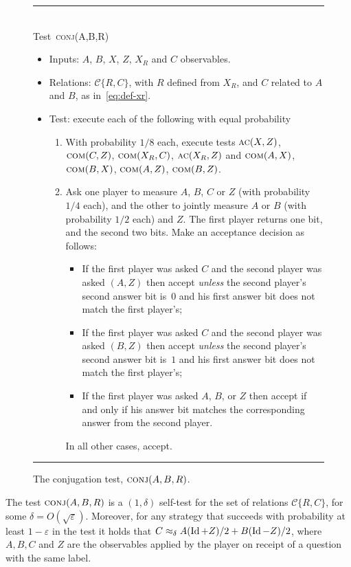 \documentclass{toc}
\newcommand{\Id}{\ensuremath{\mathop{\rm Id}\nolimits}}
\newcommand{\eps}{\varepsilon}
\newcommand{\conj}{\textsc{conj}}
\newcommand{\comt}{\textsc{com}}
\newcommand{\act}{\textsc{ac}}
\begin{document}
%
%

\begin{figure}[H]
\rule[1ex]{\textwidth}{0.5pt}\\
Test~\conj(A,B,R) 
\begin{itemize}
\setlength\itemsep{-0.25em}   %
    \item Inputs: $A$, $B$, $X$, $Z$, $X_R$ and $C$ observables.
    \item Relations:  $\mathcal{C}\{R,C\} $, with $R$ defined from $X_R$, and $C$ related to $A$ and $B$, as in~\eqref{eq:def-xr}. 
    \item Test: execute each of the following with equal probability
      \begin{enumerate}
\setlength\itemsep{-0.17em}   %
\item[(a)] With probability $1/8$ each, execute tests $\act(X,Z)$,  $\comt(C,Z)$, $\comt(X_R,C)$,   $\act(X_R,Z)$ and $\comt(A,X)$, $\comt(B,X)$, $\comt(A,Z)$, $\comt(B,Z)$. 
\item[(b)] Ask one player to measure $A$, $B$, $C$ or $Z$ (with probability $1/4$ each), and the other to jointly measure $A$ or $B$ (with probability $1/2$ each) and $Z$. The first player returns one bit, and the second two bits. Make an acceptance decision as follows: 
\begin{itemize}
\item If the first player was asked $C$ and the second player was asked $(A,Z)$ then accept \emph{unless} the second player's second answer bit is~$0$ and his first answer bit does not match the first player's;
\item If the first player was asked $C$ and the second player was asked $(B,Z)$ then accept \emph{unless} the second player's second answer bit is~$1$ and his first answer bit does not match the first player's;
\item If the first player was asked $A$, $B$, or $Z$ then accept if and only if his answer bit matches the corresponding answer from the second player.
\end{itemize}
In all other cases, accept. 
\end{enumerate}
\end{itemize}
\rule[2ex]{\textwidth}{0.5pt}\vspace{-0.5cm}
\caption{The conjugation test, $\conj(A,B,R)$.}
\label{fig:conjugation-test-1}
\end{figure}

\begin{lemma}\label{lem:conj}
The test $\conj(A,B,R)$ is a $(1,\delta)$ self-test for the set of relations
  $\mathcal{C}\{R,C\}$, for some $\delta = O(\sqrt{\eps})$. Moreover, for any
  strategy that succeeds with probability at least $1-\eps$ in the test it holds
  that $C \approx_{\delta} A  (\Id+Z)/2 + B
 (\Id-Z)/2$, where $A,B,C$ and $Z$ are the observables applied by the player on receipt of a question with the same label. 
\end{lemma}
\end{document}
